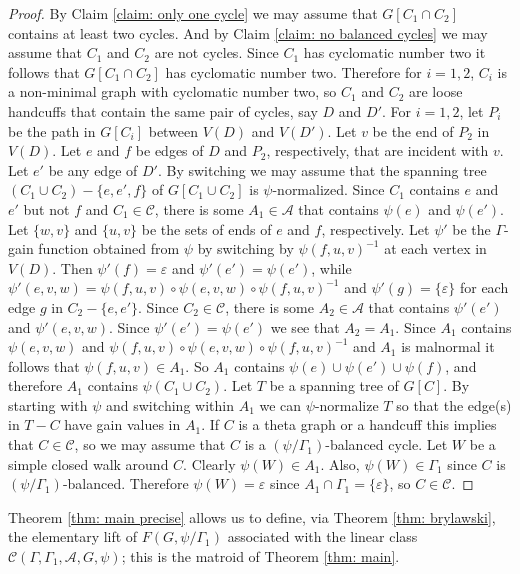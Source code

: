 \documentclass[12pt]{article}
\theoremstyle{definition}
\newcommand{\cA}{\mathcal{A}}
\newcommand{\cC}{\mathcal{C}}
\newcommand{\ep}{\varepsilon}
\begin{document}
\begin{proof}
By Claim \ref{claim: only one cycle} we may assume that $G[C_1 \cap C_2]$ contains at least two cycles.
And by Claim \ref{claim: no balanced cycles} we may assume that $C_1$ and $C_2$ are not cycles.
Since $C_1$ has cyclomatic number two it follows that $G[C_1 \cap C_2]$ has cyclomatic number two.
Therefore for $i = 1,2$, $C_i$ is a non-minimal graph with cyclomatic number two, so $C_1$ and $C_2$ are loose handcuffs that contain the same pair of cycles, say $D$ and $D'$.
For $i = 1,2$, let $P_i$ be the path in $G[C_i]$ between $V(D)$ and $V(D')$.
Let $v$ be the end of $P_2$ in $V(D)$.
Let $e$ and $f$ be edges of $D$ and $P_2$, respectively, that are incident with $v$.
Let $e'$ be any edge of $D'$.
By switching we may assume that the spanning tree $(C_1 \cup C_2) - \{e, e', f\}$ of $G[C_1 \cup C_2]$ is $\psi$-normalized.
Since $C_1$ contains $e$ and $e'$ but not $f$ and $C_1 \in \cC$, there is some $A_1 \in \cA$ that contains $\psi(e)$ and $\psi(e')$.
Let $\{w,v\}$ and $\{u,v\}$ be the sets of ends of $e$ and $f$, respectively.
Let $\psi'$ be the $\Gamma$-gain function obtained from $\psi$ by switching by $\psi(f, u, v)^{-1}$ at each vertex in $V(D)$.
Then $\psi'(f) = \ep$ and $\psi'(e') = \psi(e')$, while $\psi'(e, v, w) = \psi(f, u, v) \circ \psi(e, v, w) \circ \psi(f, u, v)^{-1}$ and $\psi'(g) = \{\ep\}$ for each edge $g$ in $C_2 - \{e, e'\}$.
Since $C_2 \in \cC$, there is some $A_2 \in \cA$ that contains $\psi'(e')$ and $\psi'(e, v, w)$.
Since $\psi'(e') = \psi(e')$ we see that $A_2 = A_1$.
Since $A_1$ contains $\psi(e, v, w)$ and $\psi(f, u, v) \circ \psi(e, v, w) \circ \psi(f, u, v)^{-1}$ and $A_1$ is malnormal it follows that $\psi(f, u, v) \in A_1$.
So $A_1$ contains $\psi(e) \cup \psi(e') \cup \psi(f)$, and therefore $A_1$ contains $\psi(C_1 \cup C_2)$.
Let $T$ be a spanning tree of $G[C]$.
By starting with $\psi$ and switching within $A_1$ we can $\psi$-normalize $T$ so that the edge(s) in $T - C$ have gain values in $A_1$.
If $C$ is a theta graph or a handcuff this implies that $C \in \cC$, so we may assume that $C$ is a $(\psi/\Gamma_1)$-balanced cycle.
Let $W$ be a simple closed walk around $C$.
Clearly $\psi(W) \in A_1$.
Also, $\psi(W) \in \Gamma_1$ since $C$ is $(\psi/\Gamma_1)$-balanced.
Therefore $\psi(W) = \ep$ since $A_1 \cap \Gamma_1 = \{\ep\}$, so $C \in \cC$.
\end{proof}








Theorem \ref{thm: main precise} allows us to define, via Theorem \ref{thm: brylawski}, the elementary lift of $F(G, \psi/\Gamma_1)$ associated with the linear class $\cC(\Gamma, \Gamma_1, \cA, G, \psi)$; this is the matroid of Theorem \ref{thm: main}.
\end{document}
